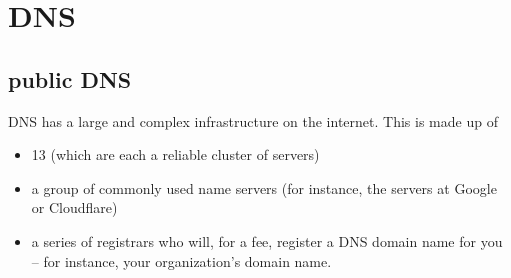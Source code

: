 \documentclass[dvipsnames]{article}
\begin{document}
\begin{comment}
\Cola{ARP} is used to find the MAC address of a network neighbour for a given IPv4 Address.

\cSay{
  When a host wants to \cola{talk} to another host \cola{in the same subnet} using its IP address, it will
  \begin{enumerate}
  \item check its \Cola{ARP cache} to see whether there's a MAC address that matches that IP.
  \item If there isn't, it will send an ARP request to the local broadcast address.
  \item When the corresponding MAC is found, it will \colb{establish port-to-port communications (Next)}.
  \end{enumerate}
}

\section{Port to Port : TCP and UDP}

\cSay{There're two types of ports:
  \begin{description}
  \item[fixed server ports:] $0 <= p <= 1023$ usually for \cola{server}
  \item[ephemeral (short-lived) ports:] $1024 <= p <= 65535$ usually for
    \cola{client}. Among them, we have
    \begin{itemize}
    \item $1024 <= p <= 49151$ user ports
    \item $49152  <= p <= 65535$ dynamic or private ports
    \end{itemize}
  \end{description}
}

\end{comment}

\section{DNS}

\subsection{public DNS}

DNS has a large and complex infrastructure on the internet. This is made up of
\begin{itemize}
\item 13 (which are each a reliable cluster
  of servers)
\item a group of commonly used name servers (for instance, the servers at Google or Cloudflare)
\item a series of registrars who will, for a fee, register a DNS domain name for
  you -- for instance, your organization's domain name.
\end{itemize}
\end{document}
